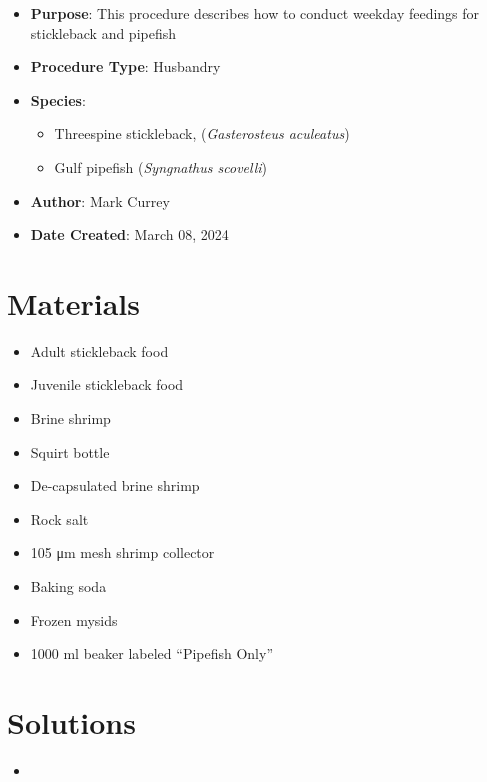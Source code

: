 \documentclass[
  letterpaper,
  DIV=11,
  numbers=noendperiod]{scrreprt}
\providecommand{\tightlist}{%
  \setlength{\itemsep}{0pt}\setlength{\parskip}{0pt}}\usepackage{longtable,booktabs,array}
\begin{document}
\begin{itemize}
\tightlist
\item
  \textbf{Purpose}: This procedure describes how to conduct weekday
  feedings for stickleback and pipefish
\item
  \textbf{Procedure Type}: Husbandry
\item
  \textbf{Species}:

  \begin{itemize}
  \tightlist
  \item
    Threespine stickleback, (\emph{Gasterosteus aculeatus})
  \item
    Gulf pipefish (\emph{Syngnathus scovelli})
  \end{itemize}
\item
  \textbf{Author}: Mark Currey
\item
  \textbf{Date Created}: March 08, 2024
\end{itemize}

\hypertarget{materials-46}{%
\section{Materials}\label{materials-46}}

\begin{itemize}
\tightlist
\item
  Adult stickleback food
\item
  Juvenile stickleback food
\item
  Brine shrimp
\item
  Squirt bottle
\item
  De-capsulated brine shrimp
\item
  Rock salt
\item
  105 μm mesh shrimp collector
\item
  Baking soda
\item
  Frozen mysids
\item
  1000 ml beaker labeled ``Pipefish Only''
\end{itemize}

\hypertarget{solutions-37}{%
\section{Solutions}\label{solutions-37}}

\begin{itemize}
\tightlist
\item
\end{itemize}
\end{document}
